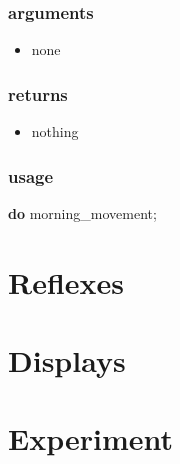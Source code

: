 \documentclass[]{book}
\newenvironment{Shaded}{\begin{snugshade}}{\end{snugshade}}
\newcommand{\KeywordTok}[1]{\textcolor[rgb]{0.13,0.29,0.53}{\textbf{#1}}}
\newcommand{\NormalTok}[1]{#1}
\newcommand{\OtherTok}[1]{\textcolor[rgb]{0.56,0.35,0.01}{#1}}
\providecommand{\tightlist}{%
  \setlength{\itemsep}{0pt}\setlength{\parskip}{0pt}}
\theoremstyle{definition}
\theoremstyle{definition}
\theoremstyle{definition}
\theoremstyle{remark}
\begin{document}
\hypertarget{arguments-2}{%
\subsection*{arguments}\label{arguments-2}}

\begin{itemize}
\tightlist
\item
  none
\end{itemize}

\hypertarget{returns-2}{%
\subsection*{returns}\label{returns-2}}

\begin{itemize}
\tightlist
\item
  nothing
\end{itemize}

\hypertarget{usage-2}{%
\subsection*{usage}\label{usage-2}}

\begin{Shaded}
\begin{Highlighting}[]
\KeywordTok{do}\NormalTok{ morning_movement}\OtherTok{;}
\end{Highlighting}
\end{Shaded}

\hypertarget{reflexes}{%
\chapter{Reflexes}\label{reflexes}}

\hypertarget{displays}{%
\chapter{Displays}\label{displays}}

\hypertarget{experiment}{%
\chapter{Experiment}\label{experiment}}

\printindex
\end{document}
